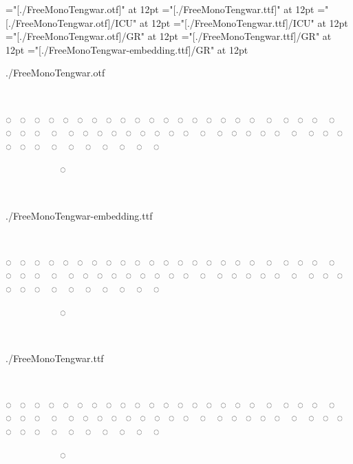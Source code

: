 

\font\opentype   ="[./FreeMonoTengwar.otf]" at 12pt
\font\graphite   ="[./FreeMonoTengwar.ttf]" at 12pt
\font\opentypeicu="[./FreeMonoTengwar.otf]/ICU" at 12pt
\font\graphiteicu="[./FreeMonoTengwar.ttf]/ICU" at 12pt
\font\opentypegr ="[./FreeMonoTengwar.otf]/GR" at 12pt
\font\graphitegr ="[./FreeMonoTengwar.ttf]/GR" at 12pt
\font\embeddinggr ="[./FreeMonoTengwar-embedding.ttf]/GR" at 12pt

\opentype ./FreeMonoTengwar.otf

                          

◌ ◌ ◌ ◌ ◌ ◌ ◌ ◌ ◌ ◌ ◌ ◌ ◌ ◌ ◌ ◌ ◌ ◌ ◌ ◌ ◌ ◌ ◌ ◌ ◌ ◌ ◌ ◌ ◌ ◌ ◌ ◌ ◌ ◌ ◌ ◌ ◌ ◌ ◌ ◌ ◌ ◌ ◌ ◌ ◌ ◌ ◌ ◌ ◌ ◌ ◌ ◌ ◌ ◌ ◌ ◌

      ◌‍ ‍ ‍ ‍

~

./FreeMonoTengwar-embedding.ttf

\embeddinggr

                          

◌ ◌ ◌ ◌ ◌ ◌ ◌ ◌ ◌ ◌ ◌ ◌ ◌ ◌ ◌ ◌ ◌ ◌ ◌ ◌ ◌ ◌ ◌ ◌ ◌ ◌ ◌ ◌ ◌ ◌ ◌ ◌ ◌ ◌ ◌ ◌ ◌ ◌ ◌ ◌ ◌ ◌ ◌ ◌ ◌ ◌ ◌ ◌ ◌ ◌ ◌ ◌ ◌ ◌ ◌ ◌

      ◌‍ ‍ ‍ ‍

~

\graphitegr ./FreeMonoTengwar.ttf

                          

◌ ◌ ◌ ◌ ◌ ◌ ◌ ◌ ◌ ◌ ◌ ◌ ◌ ◌ ◌ ◌ ◌ ◌ ◌ ◌ ◌ ◌ ◌ ◌ ◌ ◌ ◌ ◌ ◌ ◌ ◌ ◌ ◌ ◌ ◌ ◌ ◌ ◌ ◌ ◌ ◌ ◌ ◌ ◌ ◌ ◌ ◌ ◌ ◌ ◌ ◌ ◌ ◌ ◌ ◌ ◌

      ◌‍ ‍ ‍ ‍

~


